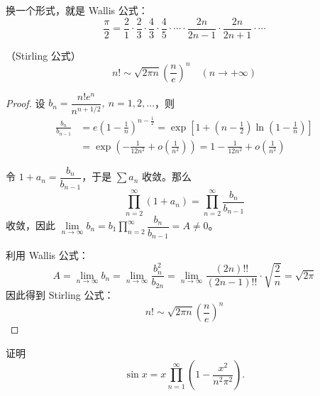 换一个形式，就是 Wallis 公式：
\[
\frac{\pi}{2} = \frac{2}{1} \cdot \frac{2}{3} \cdot \frac{4}{3} \cdot \frac{4}{5} \cdot \cdots \cdot \frac{2n}{2n-1} \cdot \frac{2n}{2n+1} \cdot \cdots
\]
\begin{proposition}
	（Stirling 公式）
	\[
	n! \sim \sqrt{2\pi n} \left( \frac{n}{e} \right)^n \quad (n \to +\infty)
	\]
	
\end{proposition}
\begin{proof}
	设 \( b_n = \dfrac{n! e^n}{n^{n+1/2}}, \ n=1,2,\dots \)，则
	\[
	\begin{aligned}
		\frac{b_n}{b_{n-1}} &= e\left(1 - \frac{1}{n}\right)^{n - \frac{1}{2}}
		= \exp\left[1 + \left(n - \frac{1}{2}\right)\ln\left(1 - \frac{1}{n}\right)\right] \\
		&= \exp\left( -\frac{1}{12n^2} + o\left(\frac{1}{n^2}\right) \right)
		= 1 - \frac{1}{12n^2} + o\left(\frac{1}{n^2}\right)
	\end{aligned}
	\]
	
	令 \( 1 + a_n = \dfrac{b_n}{b_{n-1}} \)，于是 \( \sum a_n \) 收敛。那么
	\[
	\prod_{n=2}^{\infty} (1 + a_n) = \prod_{n=2}^{\infty} \frac{b_n}{b_{n-1}}
	\]
	收敛，因此 \( \lim\limits_{n \to \infty} b_n = b_1 \displaystyle\prod_{n=2}^{\infty} \dfrac{b_n}{b_{n-1}} = A \neq 0 \)。
	
	利用 Wallis 公式：
	\[
	A = \lim_{n \to \infty} b_n = \lim_{n \to \infty} \frac{b_n^2}{b_{2n}}
	= \lim_{n \to \infty} \frac{(2n)!!}{(2n-1)!!} \cdot \sqrt{\frac{2}{n}} = \sqrt{2\pi}
	\]
	因此得到 Stirling 公式：
	\[
	n! \sim \sqrt{2\pi n} \left( \frac{n}{e} \right)^n
	\]
\end{proof}
\begin{example}
	证明
	\[
	\sin x=x\prod_{n=1}^{\infty}\left(1-\frac{x^2}{n^2\pi^2}\right).
	\]
\end{example}

